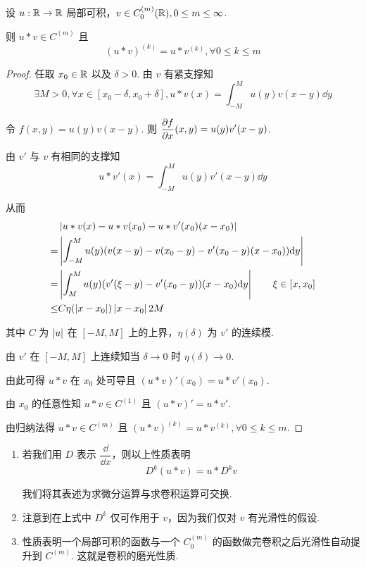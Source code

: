 \begin{property}
    设 $u:\mathbb{R}\to\mathbb{R}$ 局部可积，$v\in C^{(m)}_0(\mathbb{R}),0\le m\le\infty$.

    则 $u*v\in C^{(m)}$ 且
$$
(u*v)^{(k)}=u*v^{(k)},\forall 0\le k\le m
$$
\end{property}
\begin{proof}
    任取 $x_0\in\mathbb{R}$ 以及 $\delta>0$. 由 $v$ 有紧支撑知
$$
\exists M>0,\forall x\in[x_0-\delta,x_0+\delta],u*v(x)=\int_{-M}^M u(y)v(x-y)\dd y
$$

    令 $f(x,y)=u(y)v(x-y)$. 则 $\displaystyle\frac{\partial{f}}{\partial{x}}(x,y)=u(y)v'(x-y)$.

    由 $v'$ 与 $v$ 有相同的支撑知
$$
u*v'(x)=\int_{-M}^M u(y)v'(x-y)\dd y
$$

    从而
$$
\begin{aligned}
    &\left\lvert{u*v(x)-u*v(x_0)-u*v'(x_0)(x-x_0)}\right\rvert\\
    =&\left\lvert{\int_{-M}^M u(y)(v(x-y)-v(x_0-y)-v'(x_0-y)(x-x_0))\mathrm{d}y}\right\rvert\\
    =&\left\lvert{\int_M^M u(y)(v'(\xi-y)-v'(x_0-y))(x-x_0)\mathrm{d}y}\right\rvert\qquad\xi\in[x,x_0]\\
    \le&C\eta(\left\lvert{x-x_0}\right\rvert)\left\lvert{x-x_0}\right\rvert2M
\end{aligned}
$$

    其中 $C$ 为 $\left\lvert{u}\right\rvert$ 在 $[-M,M]$ 上的上界，$\eta(\delta)$ 为 $v'$ 的连续模.

    由 $v'$ 在 $[-M,M]$ 上连续知当 $\delta\to 0$ 时 $\eta(\delta)\to 0$.

    由此可得 $u*v$ 在 $x_0$ 处可导且 $(u*v)'(x_0)=u*v'(x_0)$.

    由 $x_0$ 的任意性知 $u*v\in C^{(1)}$ 且 $(u*v)'=u*v'$.

    由归纳法得 $u*v\in C^{(m)}$ 且 $(u*v)^{(k)}=u*v^{(k)},\forall 0\le k\le m$.
\end{proof}

\begin{hint}
    \begin{enumerate}
        \item 若我们用 $D$ 表示 $\dfrac{\dd}{\dd x}$，则以上性质表明
$$
D^k(u*v)=u*D^kv
$$

        我们将其表述为求微分运算与求卷积运算可交换.

        \item 注意到在上式中 $D^k$ 仅可作用于 $v$，因为我们仅对 $v$ 有光滑性的假设.
        
        \item 性质表明一个局部可积的函数与一个 $C_0^{(m)}$ 的函数做完卷积之后光滑性自动提升到 $C^{(m)}$. 这就是卷积的磨光性质.
    \end{enumerate}
\end{hint}

